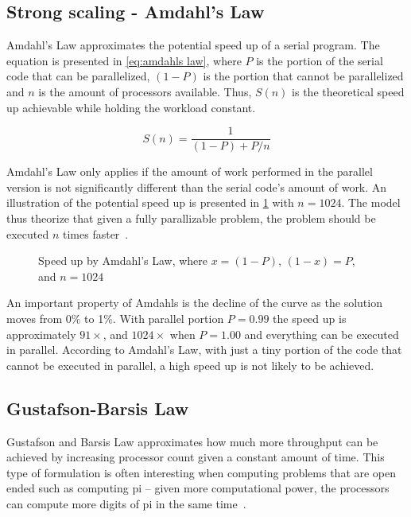 \subsection{Strong scaling - Amdahl's Law}
\label{sec:amdahls law}

Amdahl's Law approximates the potential speed up of a serial program.
The equation is presented in \cref{eq:amdahls law}, where $P$ is the portion of the serial code that can be parallelized, $(1-P)$ is the portion that cannot be parallelized and $n$ is the amount of processors available.
Thus, $S(n)$ is the theoretical speed up achievable while holding the workload constant.

\begin{equation}
  \label{eq:amdahls law}
  S(n) = \frac{1}{(1-P) + P/n}
\end{equation}

Amdahl's Law only applies if the amount of work performed in the parallel version is not significantly different than the serial code's amount of work.
An illustration of the potential speed up is presented in \cref{fig:amdahls law} with $n=1024$.
The model thus theorize that given a fully parallizable problem, the problem should be executed $n$ times faster~\cite{farber2011cuda}.

\begin{figure}[htb]
  \centering
  
  \caption{Speed up by Amdahl's Law, where $x=(1-P)$, $(1-x)=P$, and $n=1024$}
  \label{fig:amdahls law}
\end{figure}

An important property of Amdahls is the decline of the curve as the solution moves from 0\% to 1\%.
With parallel portion $P=0.99$ the speed up is approximately $91\times$, and $1024\times$ when $P=1.00$ and everything can be executed in parallel.
According to Amdahl's Law, with just a tiny portion of the code that cannot be executed in parallel, a high speed up is not likely to be achieved.


\subsection{Gustafson-Barsis Law}
\label{sec:gustafson-barsis law}

Gustafson and Barsis Law approximates how much more throughput can be achieved by increasing processor count given a constant amount of time.
This type of formulation is often interesting when computing problems that are open ended such as computing pi -- given more computational power, the processors can compute more digits of pi in the same time~\cite{amdahlorgustafson2011}.


